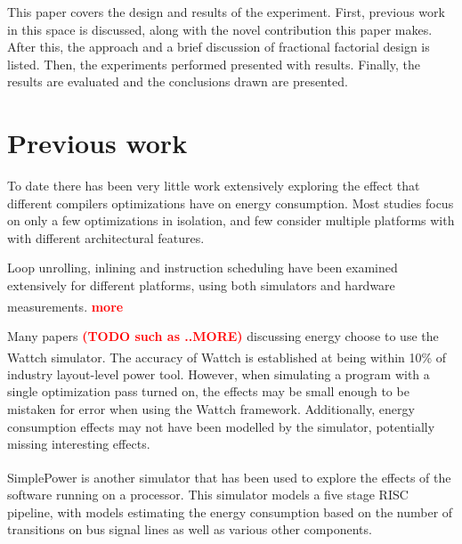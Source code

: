 \documentclass[twocolumn]{article}
\newcommand{\todo}[1]{\textbf{\textcolor{red}{#1}}}
\let\oldcite\cite
\renewcommand{\cite}[1]{\textsuperscript{\oldcite{#1}}}
\begin{document}

This paper covers the design and results of the experiment. First, previous work in this space is discussed, along with the novel contribution this paper makes. After this, the approach and a brief discussion of fractional factorial design is listed. Then, the experiments performed presented with results. Finally, the results are evaluated and the conclusions drawn are presented.

\section*{Previous work}

To date there has been very little work extensively exploring the effect that different compilers optimizations have on energy consumption. Most studies focus on only a few optimizations in isolation, and few consider multiple platforms with with different architectural features.

Loop unrolling, inlining and instruction scheduling have been examined extensively for different platforms, using both simulators and hardware measurements\cite{EffectOfCompilerOptimizationsOnPentium4}. \todo{more}

Many papers \todo{(TODO such as ..MORE)} discussing energy choose to use the Wattch simulator\cite{Wattch}. The accuracy of Wattch is established at being within 10\% of industry layout-level power tool. However, when simulating a program with a single optimization pass turned on, the effects may be small enough to be mistaken for error when using the Wattch framework. Additionally, energy consumption effects may not have been modelled by the simulator, potentially missing interesting effects.

SimplePower\cite{SimplePower} is another simulator that has been used to explore the effects of the software running on a processor. This simulator models a five stage RISC pipeline, with models estimating the energy consumption based on the number of transitions on bus signal lines as well as various other components.
\end{document}
